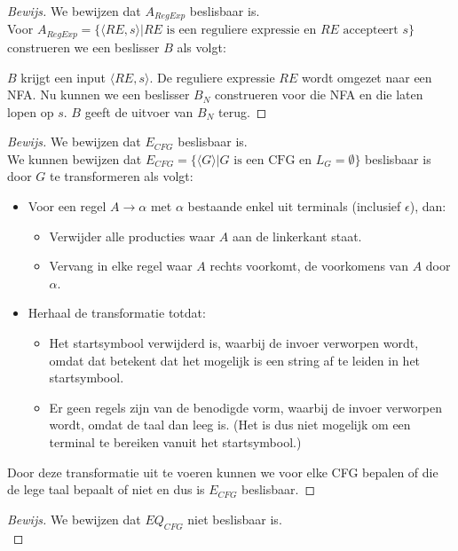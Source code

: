 \documentclass[a4paper]{article}
\newenvironment{bewijs}[1]%
  {\begin{mdframed}[topline=true,
    rightline=true,
    leftline=true,
    bottomline=true]\begin{proof}[Bewijs]#1\\[.2cm]\normalfont}%
  {\end{proof}\end{mdframed}}
\begin{document}
\begin{bewijs}{We bewijzen dat $A_{RegExp}$ beslisbaar is.}
  Voor $A_{RegExp} = \{\langle RE,s \rangle | RE \text{ is een reguliere expressie en } RE \text{ accepteert } s\}$ construeren we een beslisser $B$ als volgt:
 
 $B$ krijgt een input $\langle RE,s \rangle$. De reguliere expressie $RE$ wordt omgezet naar een NFA. Nu kunnen we een beslisser $B_N$ construeren voor die NFA en die laten lopen op $s$. $B$ geeft de uitvoer van $B_N$ terug.
\end{bewijs}


\begin{bewijs}{We bewijzen dat $E_{CFG}$ beslisbaar is.}
  We kunnen bewijzen dat $E_{CFG} = \{\langle G \rangle | G \text{ is een CFG en } L_G = \emptyset\}$ beslisbaar is door $G$ te transformeren als volgt:
  \begin{itemize}
  \item Voor een regel $A \rightarrow \alpha$ met $\alpha$ bestaande enkel uit terminals (inclusief $\epsilon$), dan:
  \begin{itemize}
  \item Verwijder alle producties waar $A$ aan de linkerkant staat.
  \item Vervang in elke regel waar $A$ rechts voorkomt, de voorkomens van $A$ door $\alpha$.
  \end{itemize}
  \item Herhaal de transformatie totdat:
  \begin{itemize}
  \item Het startsymbool verwijderd is, waarbij de invoer verworpen wordt, omdat dat betekent dat het mogelijk is een string af te leiden in het startsymbool.
  \item Er geen regels zijn van de benodigde vorm, waarbij de invoer verworpen wordt, omdat de taal dan leeg is. (Het is dus niet mogelijk om een terminal te bereiken vanuit het startsymbool.)
  \end{itemize}
  \end{itemize}
  Door deze transformatie uit te voeren kunnen we voor elke CFG bepalen of die de lege taal bepaalt of niet en dus is $E_{CFG}$ beslisbaar.
\end{bewijs}

\begin{bewijs}{We bewijzen dat $EQ_{CFG}$ niet beslisbaar is.}
  
\end{bewijs}
\end{document}
